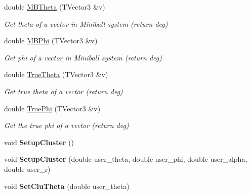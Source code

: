\begin{DoxyCompactItemize}
double \hyperlink{class_m_b_geometry_af4adfb858000405b21f79a6bf10c3c37}{M\+B\+Theta} (T\+Vector3 \&v)
\begin{DoxyCompactList}\small\item\em Get theta of a vector in Miniball system (return deg) \end{DoxyCompactList}\item 
\mbox{\label{class_m_b_geometry_a399568d67bb83801ef6a2dbe963a535e}} 
double \hyperlink{class_m_b_geometry_a399568d67bb83801ef6a2dbe963a535e}{M\+B\+Phi} (T\+Vector3 \&v)
\begin{DoxyCompactList}\small\item\em Get phi of a vector in Miniball system (return deg) \end{DoxyCompactList}\item 
\mbox{\label{class_m_b_geometry_afd393f9db7182de7fb19f0c934edb383}} 
double \hyperlink{class_m_b_geometry_afd393f9db7182de7fb19f0c934edb383}{True\+Theta} (T\+Vector3 \&v)
\begin{DoxyCompactList}\small\item\em Get true theta of a vector (return deg) \end{DoxyCompactList}\item 
\mbox{\label{class_m_b_geometry_a718d9c7fcc4a5fb8b9ecaabdc7a0503f}} 
double \hyperlink{class_m_b_geometry_a718d9c7fcc4a5fb8b9ecaabdc7a0503f}{True\+Phi} (T\+Vector3 \&v)
\begin{DoxyCompactList}\small\item\em Get the true phi of a vector (return deg) \end{DoxyCompactList}\item 
\mbox{\label{class_m_b_geometry_a4d98a38f0dc1ca6a4a73477dde5cdd8d}} 
void {\bfseries Setup\+Cluster} ()
\item 
\mbox{\label{class_m_b_geometry_a93f157cebad3f63dbbefb5b08f3555af}} 
void {\bfseries Setup\+Cluster} (double user\+\_\+theta, double user\+\_\+phi, double user\+\_\+alpha, double user\+\_\+r)
\item 
\mbox{\label{class_m_b_geometry_a9a2a8c9609141be92d7ba30e6087aa30}} 
void {\bfseries Set\+Clu\+Theta} (double user\+\_\+theta)

\end{DoxyCompactItemize}
